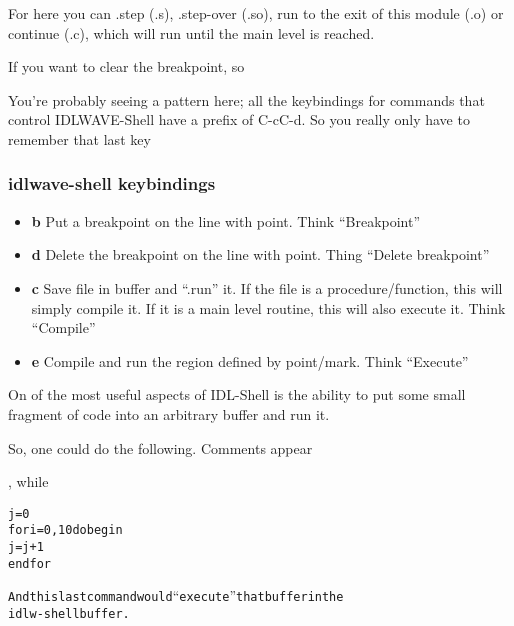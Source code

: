   For here you can .step (.s), .step-over (.so), run to the exit of
  this module (.o) or continue (.c), which will run until the main
  level is reached.

  If you want to clear the breakpoint, so 


  You're probably seeing a pattern here; all the keybindings for
  commands that control IDLWAVE-Shell have a prefix of C-cC-d. So you
  really only have to remember that last key 

  \subsubsection{idlwave-shell keybindings}
  

    \begin{itemize}

    \item \textbf{b} Put a breakpoint on the line with point. 
           Think ``Breakpoint''

    \item \textbf{d} Delete the breakpoint on the line with
           point. Thing ``Delete breakpoint''

    \item \textbf{c} Save file in buffer and ``.run'' it. If the file
  is a procedure/function, this will simply compile it. If it is a main level
  routine, this will also execute it. Think ``Compile''

    \item \textbf{e} Compile and run the region defined by
    point/mark. Think ``Execute''

    \end{itemize}

  
  On of the most useful aspects of IDL-Shell is the ability to put
  some small fragment of code into an arbitrary buffer and run it.


  So, one could do the following. Comments appear 

   , while 

\begin{alltt}





   j=0
   for i=0,10 do begin 
     j=j+1 
   endfor 


   And this last command would ``execute'' that buffer in the
  idlw-shell buffer.

\end{alltt}

